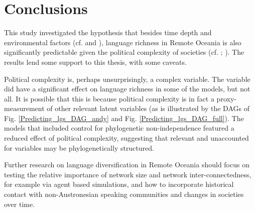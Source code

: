 \documentclass[unnumsec,webpdf,modern,medium]{oup-authoring-template}
\begin{document}
\FloatBarrier
\section{Conclusions}
This study investigated the hypothesis that besides time depth and environmental factors (cf. \citet{curriemace2009, gavin2012island, hua2019ecological} and \citet{Pacheco_Coelho_2019}), language richness in Remote Oceania is also significantly predictable given the political complexity of societies (cf. \citet{turner1884}; \citet{pawley81, pawley2007}). The results lend some support to this thesis, with some caveats. 

Political complexity is, perhaps unsurprisingly, a complex variable. The variable did have a significant effect on language richness in some of the models, but not all. It is possible that this is because political complexity is in fact a proxy-measurement of other relevant latent variables (as is illustrated by the DAGs of Fig. \ref{Predicting_lgs_DAG_andy} and Fig. \ref{Predicting_lgs_DAG_full}). The models that included control for phylogenetic non-independence featured a reduced effect of political complexity, suggesting that relevant and unaccounted for variables may be phylogenetically structured.

Further research on language diversification in Remote Oceania should focus on testing the relative importance of network size and network inter-connectedness, for example via agent based simulations, and how to incorporate historical contact with non-Austronesian speaking communities and changes in societies over time.




\end{document}
